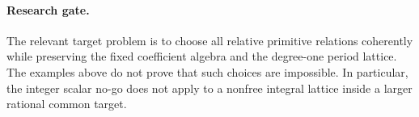 \paragraph{Research gate.}
The relevant target problem is to choose all relative primitive relations coherently while preserving the fixed coefficient algebra and the degree-one period lattice. The examples above do not prove that such choices are impossible. In particular, the integer scalar no-go does not apply to a nonfree integral lattice inside a larger rational common target.

